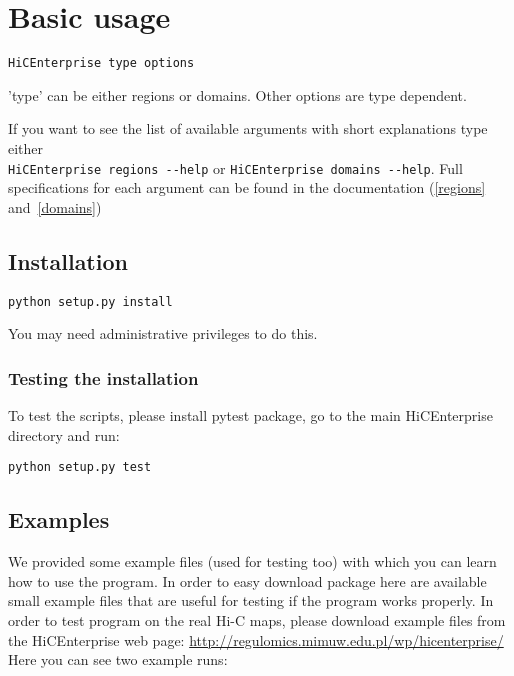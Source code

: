 \section{Basic usage}

\begin{lstlisting}
HiCEnterprise type options
\end{lstlisting}


'type' can be either regions or domains. Other options are type dependent.

If you want to see the list of available arguments with short explanations type either \\
\lstinline{HiCEnterprise regions --help}
or \lstinline{HiCEnterprise domains --help}. Full specifications for each argument can be found in the documentation
(\ref{regions} and~\ref{domains}) \\


\subsection{Installation}

\begin{lstlisting}
python setup.py install
\end{lstlisting}


You may need administrative privileges to do this.\\


\subsubsection{Testing the installation}

To test the scripts, please install pytest package, go to the main HiCEnterprise directory and run:

\begin{lstlisting}
python setup.py test
\end{lstlisting}


\subsection{Examples}

We provided some example files (used for testing too) with which you can learn how to use the program. In order to easy download package here are available small example files that are useful for testing if the program works properly. In order to test program on the real Hi-C maps, please download example files from the HiCEnterprise web page: \url{http://regulomics.mimuw.edu.pl/wp/hicenterprise/}
Here you can see two example runs:

